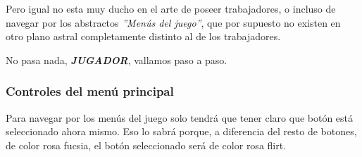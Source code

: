Pero igual no esta muy ducho en el arte de poseer \textcolor{azulWorker}{trabajadores}, o incluso de navegar por los abstractos \textit{''Menús del juego''}, que por supuesto no existen en otro \textcolor{endeavour}{plano astral} completamente distinto al de los \textcolor{azulWorker}{trabajadores}.

No pasa nada, \textit{\textbf{JUGADOR}}, vallamos paso a paso.

\subsubsection{Controles del menú principal}
Para navegar por los menús del juego solo tendrá que tener claro que botón está seleccionado ahora mismo. Eso lo sabrá porque, a diferencia del resto de botones, de color \textcolor{fucsia}{rosa fucsia}, el botón seleccionado será de color \textcolor{flirk}{rosa flirt}.


